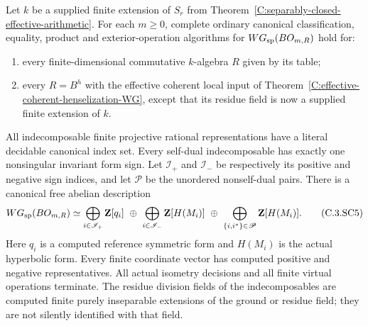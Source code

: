 \begin{theorem}
\label{C:separably-closed-coefficient-WG}
Let $k$ be a supplied finite extension of
$S_r$ from
Theorem~\ref{C:separably-closed-effective-arithmetic}.
For each $m\ge0$, complete ordinary
canonical classification, equality,
product and exterior-operation algorithms
for $WG_{\rm sp}(BO_{m,R})$ hold for:
\begin{enumerate}
\item every finite-dimensional commutative
$k$-algebra $R$ given by its table;
\item every $R=B^h$ with the effective
coherent local input of
Theorem~\ref{C:effective-coherent-henselization-WG},
except that its residue field is now
a supplied finite extension of $k$.
\end{enumerate}
All indecomposable finite projective
rational representations have a literal
decidable canonical index set.
Every self-dual indecomposable has
exactly one nonsingular invariant
form sign.
Let $\mathscr I_+$ and $\mathscr I_-$
be respectively its positive and
negative sign indices, and let
$\mathscr P$ be the unordered
nonself-dual pairs.
There is a canonical free abelian
description
\[
 WG_{\rm sp}(BO_{m,R})\simeq
 \bigoplus_{i\in\mathscr I_+}\mathbf Z[q_i]
 \ \oplus\
 \bigoplus_{i\in\mathscr I_-}\mathbf Z[H(M_i)]
 \ \oplus\
 \bigoplus_{\{i,i^*\}\in\mathscr P}\mathbf Z[H(M_i)] . \tag{C.3.SC5}
\]
Here $q_i$ is a computed reference
symmetric form and $H(M_i)$ is the
actual hyperbolic form.
Every finite coordinate vector has
computed positive and negative
representatives.  All actual isometry
decisions and all finite virtual
operations terminate.
The residue division fields of the
indecomposables are computed finite
purely inseparable extensions of
the ground or residue field; they
are not silently identified with
that field.
\end{theorem}
